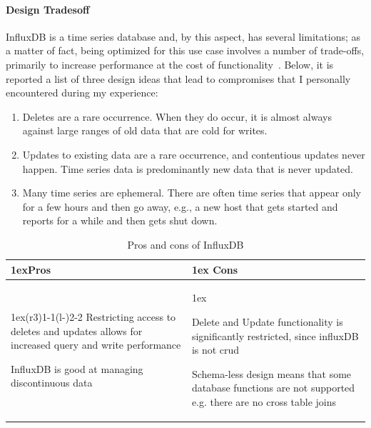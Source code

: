 \paragraph{Design Tradesoff}
InfluxDB is a time series database and, by this aspect, has several limitations; as a matter of fact, 
being optimized for this use case involves a number of trade-offs, primarily to increase performance at the cost of functionality~\cite{Misc:influx_docs}.
Below, it is reported a list of three design ideas that lead to compromises that I personally encountered during my experience:
\begin{enumerate}
    \item Deletes are a rare occurrence. When they do occur, it is almost always against large ranges of old data that are cold for writes.
    \item Updates to existing data are a rare occurrence, and contentious updates never happen. Time series data is predominantly new data that is never updated.
    \item Many time series are ephemeral. There are often time series that appear only for a few hours and then go away, e.g., a new host that gets started and reports for a while and then gets shut down.
\end{enumerate}
\begin{table}[ht]
    \begin{tabularx}{\linewidth}{>{\parskip1ex}X@{\kern4\tabcolsep}>{\parskip1ex}X}
        \toprule
        \hfil\bfseries Pros
         &
        \hfil\bfseries Cons
        \\\cmidrule(r{3\tabcolsep}){1-1}\cmidrule(l{-\tabcolsep}){2-2}
        Restricting access to deletes and updates allows for increased query and write performance\par
        InfluxDB is good at managing discontinuous data\par

         &

        Delete and Update functionality is significantly restricted, since influxDB is not \acs{crud} \par
        Schema-less design means that some database functions are not supported e.g. there are no cross table joins\par
        \\\bottomrule
    \end{tabularx}
    \caption{Pros and cons of InfluxDB}
\end{table}


